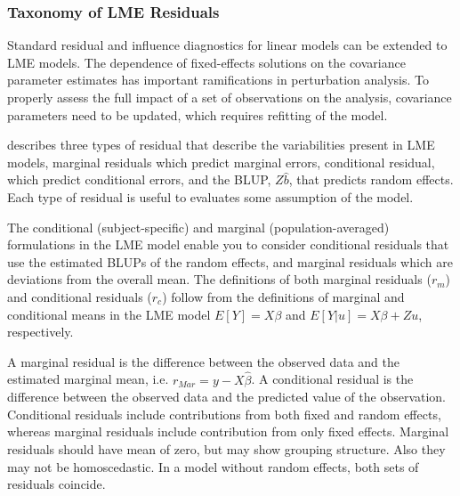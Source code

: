 \documentclass[12pt, a4paper]{report}
\theoremstyle{definition}
\theoremstyle{remark}
\begin{document}



\subsubsection{Taxonomy of LME Residuals}
Standard residual and influence diagnostics for linear models can
be extended to LME models. The dependence of
fixed-effects solutions on the covariance parameter estimates has
important ramifications in perturbation analysis. To properly assess the
full impact of a set of observations on the analysis, covariance
parameters need to be updated, which requires refitting of the
model.

\citet{PB} describes three types of residual that describe the variabilities
present in LME models, marginal residuals which predict marginal errors, conditional residual, which predict conditional errors, and the BLUP, $ {Z\hat{b}}$, that predicts random effects. Each type of residual is useful to evaluates some assumption of the model.

The conditional (subject-specific) and marginal (population-averaged) formulations in the LME model enable you to consider conditional residuals that use the estimated BLUPs of the random effects, and marginal residuals which are deviations from the overall mean. The definitions of both marginal residuals ($r_m$) and conditional residuals ($r_c$) follow from the definitions of marginal and conditional means in the LME model 
$E[{Y}] = {X}{\beta}$ and $E[{Y|{u}}] = {X}{\beta} + {Z}{u}$, respectively.

A marginal residual is the difference between the observed data and the estimated marginal mean, i.e. $r_{Mar} = y - X \hat{\beta}$. A conditional residual is the difference between the observed data and the predicted value of the observation. 
 Conditional residuals include contributions from both fixed and random effects, whereas marginal residuals include contribution from only fixed effects. Marginal residuals should have mean of zero, but may show grouping structure. Also they may not be homoscedastic. In a model without random effects, both sets of residuals coincide.
\end{document}

